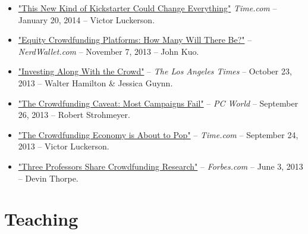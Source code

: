 \documentclass[10.5pt,letterpaper,sans]{moderncv}        %
\begin{document}
\begin{itemize}
\item \textcolor{gray}{\href{http://business.time.com/2014/01/20/ibm-internal-enterprise-crowdfunding-mimics-kickstarter/}{"This New Kind of Kickstarter Could Change Everything"}} \textit{Time.com} -- January 20, 2014 -- Victor Luckerson.

\item \textcolor{gray}{\href{http://www.nerdwallet.com/blog/investing/2013/equity-crowdfunding-platforms/}{"Equity Crowdfunding Platforms: How Many Will There Be?"}} -- \textit{NerdWallet.com} -- November 7, 2013 -- John Kuo.

\item \textcolor{gray}{\href{http://articles.latimes.com/2013/oct/23/business/la-fi-crowdfunding-20131024}{"Investing Along With the Crowd"}} -- \textit{The Los Angeles Times} -- October 23, 2013 -- Walter Hamilton \& Jessica Guynn.

\item \textcolor{gray}{\href{http://www.pcworld.com/article/2049399/the-crowdfunding-caveat-most-campaigns-fail.html}{"The Crowdfunding Caveat: Most Campaigns Fail"}} -- \textit{PC World} -- September 26, 2013 -- Robert Strohmeyer.

\item \textcolor{gray}{\href{http://business.time.com/2013/09/24/the-crowdfunding-economy-is-about-to-pop/}{"The Crowdfunding Economy is About to Pop"}} -- \textit{Time.com} -- September 24, 2013 -- Victor Luckerson.

\item \textcolor{gray}{\href{http://www.forbes.com/sites/devinthorpe/2013/06/03/three-professors-share-crowdfunding-research-tune-in-to-learn-how-to-make-your-campaign-a-success/}{"Three Professors Share Crowdfunding Research"}} -- \textit{Forbes.com} -- June 3, 2013 -- Devin Thorpe.

\end{itemize}

\section{Teaching}
\end{document}

